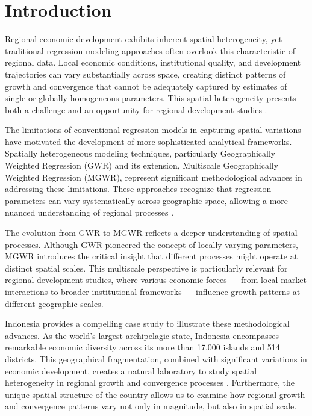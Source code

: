 \documentclass[smallextended, natbib]{svjour3}       %
\begin{document}
\newpage

\section{Introduction}


Regional economic development exhibits inherent spatial heterogeneity, yet traditional regression modeling approaches often overlook this characteristic of regional data. 
Local economic conditions, institutional quality, and development trajectories can vary substantially across space, creating distinct patterns of growth and convergence that cannot be adequately captured by estimates of single or globally homogeneous parameters.
This spatial heterogeneity presents both a challenge and an opportunity for regional development studies \citep{Ingram2019, Mendez2022, mendez2025political}.

The limitations of conventional regression models in capturing spatial variations have motivated the development of more sophisticated analytical frameworks. 
Spatially heterogeneous modeling techniques, particularly Geographically Weighted Regression (GWR) and its extension, Multiscale Geographically Weighted Regression (MGWR), represent significant methodological advances in addressing these limitations. 
These approaches recognize that regression parameters can vary systematically across geographic space, allowing a more nuanced understanding of regional processes \citep{Brunsdon1996, Fotheringham2017, Fotheringham2023}.

The evolution from GWR to MGWR reflects a deeper understanding of spatial processes. 
Although GWR pioneered the concept of locally varying parameters, MGWR introduces the critical insight that different processes might operate at distinct spatial scales. 
This multiscale perspective is particularly relevant for regional development studies, where various economic forces ----from local market interactions to broader institutional frameworks ----influence growth patterns at different geographic scales.

Indonesia provides a compelling case study to illustrate these methodological advances. 
As the world's largest archipelagic state, Indonesia encompasses remarkable economic diversity across its more than 17,000 islands and 514 districts. 
This geographical fragmentation, combined with significant variations in economic development, creates a natural laboratory to study spatial heterogeneity in regional growth and convergence processes \citep{aginta2023regional, miranti2023social, santos2022regional}.
Furthermore, the unique spatial structure of the country allows us to examine how regional growth and convergence patterns vary not only in magnitude, but also in spatial scale.
\end{document}
